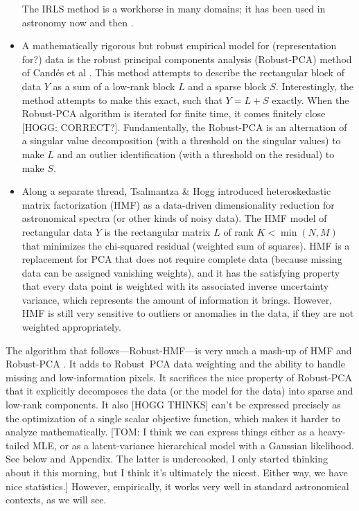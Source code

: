 \documentclass{article}
\begin{document}
\begin{itemize}
    The IRLS method is a workhorse in many domains; it has been used in astronomy now and then \cite{things}.
    \item A mathematically rigorous but robust empirical model for (representation for?) data is the robust principal components analysis (Robust-PCA) method of Cand\'es et al \cite{candes}.
    This method attempts to describe the rectangular block of data $Y$ as a sum of a low-rank block $L$ and a sparse block $S$.
    Interestingly, the method attempts to make this exact, such that $Y=L+S$ exactly.
    When the Robust-PCA algorithm is iterated for finite time, it comes finitely close [HOGG: CORRECT?].
    Fundamentally, the Robust-PCA is an alternation of a singular value decomposition (with a threshold on the singular values) to make $L$ and an outlier identification (with a threshold on the residual) to make $S$.
    \item Along a separate thread, Tsalmantza \& Hogg introduced heteroskedastic matrix factorization (HMF) \cite{hmf} as a data-driven dimensionality reduction for astronomical spectra (or other kinds of noisy data).
    The HMF model of rectangular data $Y$ is the rectangular matrix $L$ of rank $K<\min(N,M)$ that minimizes the chi-squared residual (weighted sum of squares).
    HMF is a replacement for PCA that does not require complete data (because missing data can be assigned vanishing weights), and it has the satisfying property that every data point is weighted with its associated inverse uncertainty variance, which represents the amount of information it brings.
    However, HMF is still very sensitive to outliers or anomalies in the data, if they are not weighted appropriately.
\end{itemize}
The algorithm that follows---Robust-HMF---is very much a mash-up of HMF \cite{hmf} and Robust-PCA \cite{candes}.
It adds to Robust~PCA data weighting and the ability to handle missing and low-information pixels.
It sacrifices the nice property of Robust-PCA that it explicitly decomposes the data (or the model for the data) into sparse and low-rank components.
It also [HOGG THINKS] can't be expressed precisely as the optimization of a single scalar objective function, which makes it harder to analyze mathematically.
[TOM: I think we can express things either as a heavy-tailed MLE, or as a latent-variance hierarchical model with a Gaussian likelihood. See below and Appendix. The latter is undercooked, I only started thinking about it this morning, but I think it's ultimately the nicest. Either way, we have nice statistics.]
However, empirically, it works very well in standard astronomical contexts, as we will see.
\end{document}
